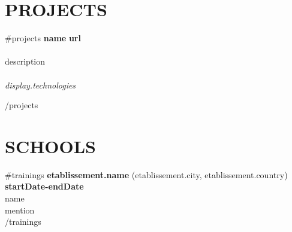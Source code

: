 \documentclass[margin]{res}
\begin{document}
\begin{resume}
\section{PROJECTS}
{{#projects}}
  \textbf{ {{name}} } \hfill \textbf{ {{{url}}} }\\ \\
  {{{description}}} \\ \\
  \textit{ {{{display.technologies}}} }

{{/projects}}


\section{SCHOOLS}
{{#trainings}}
  \textbf{ {{etablissement.name}} }  ({{etablissement.city}}, {{etablissement.country}}) \hfill \textbf{ {{startDate}}-{{endDate}} }\\
  {{name}} \\
  {{mention}} \\

{{/trainings}}

\end{resume}
\end{document}
